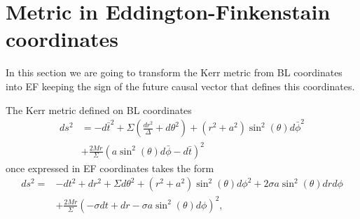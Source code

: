 \section{Metric in Eddington-Finkenstain coordinates}
In this section we are going to transform the Kerr metric from \gls{BL} coordinates into \gls{EF} keeping the sign of the future causal vector that defines this coordinates.
\begin{lemma}\label{lemma:BLtoEF}
 The Kerr metric defined on \gls{BL} coordinates
 \begin{align*}
 ds^2&=-d\bar{t}^2+ \Sigma \left(\frac{dr^2}{\Delta}+d\theta^2 \right)+(r^2+a^2)\sin^2{(\theta)} d\bar{\phi}^2\\
 &+\frac{2 M r}{\Sigma}(a \sin^2{(\theta)} d \bar{\phi} -d\bar{t})^2
\end{align*}
once expressed in \gls{EF} coordinates takes the form
\begin{equation*}
\begin{aligned}
 ds^2=&-dt^2+dr^2+\Sigma d\theta^2+(r^2+a^2) \sin^2{(\theta)} d\phi^2+2\sigma a \sin^2{(\theta)} dr d\phi\\
 &+\frac{2M r}{\Sigma}(-\sigma dt+ dr-\sigma a \sin^2{(\theta)} d\phi)^2,
 \end{aligned}
\end{equation*}
\end{lemma}
